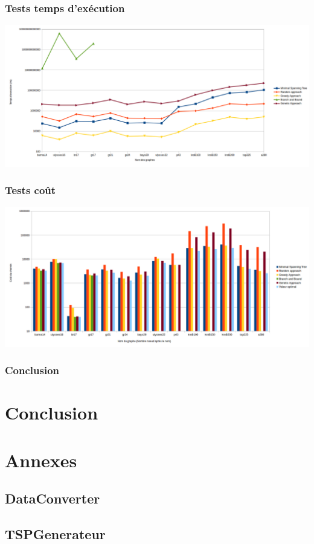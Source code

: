 \documentclass[10pt,a4paper]{report}
\begin{document}
		\subsubsection{Tests temps d'exécution}
			\includegraphics[scale=0.45]{./Ressource/temps_graphes_site.png}
		
	
	\subsubsection{Tests coût}
			\includegraphics[scale=0.45]{./Ressource/cout_graphes_site.png}
			
	\subsubsection{Conclusion}

\section{Conclusion}
\section{Annexes}

	\subsection{DataConverter}
	
	\subsection{TSPGenerateur}
\end{document}
